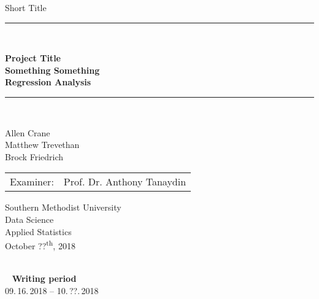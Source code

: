 
\begin{titlepage}
\begin{center}

\newcommand{\HorizontalLine}{\rule{\linewidth}{0.3mm}}

{\Large Short Title}\\[1.3cm]


\HorizontalLine \\[0.4cm]
\begin{spacing}{3}
    {\huge \bfseries Project Title } \\
    {\huge \bfseries Something Something} \\
    {\huge \bfseries Regression Analysis}\\
\end{spacing}
\HorizontalLine \\[1.5cm]

\begin{spacing}{3}
    {\Huge Allen Crane} \\
    {\Huge Matthew Trevethan} \\
    {\Huge Brock Friedrich} \\[2cm]
\end{spacing}

\begin{tabular}[hc]{>{\huge}l >{\huge}l}
Examiner: & Prof. Dr. Anthony Tanaydin \\[0.3cm]
\end{tabular}
\vfill  %


\Large {
    Southern Methodist University\\
    Data Science\\
    Applied Statistics\\[1cm]

    October ??\textsuperscript{th}, 2018\\
}
\end{center}
\end{titlepage}

\ \vfill \ \\  %
\
\textbf{Writing period}            \smallskip{} \\
09.\,16.\,2018 -- 10.\,??.\,2018   \bigskip{} \\
\